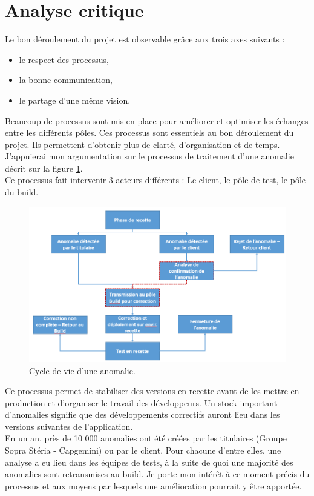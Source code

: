\documentclass[12pt,a4paper]{article}
\begin{document}
\section{Analyse critique}
Le bon déroulement du projet est observable grâce aux trois axes suivants :
\begin{itemize}
\item le respect des processus,
\item la bonne communication,
\item le partage d'une même vision.
\end{itemize}
Beaucoup de processus sont mis en place pour améliorer et optimiser les échanges entre les différents pôles. Ces processus sont essentiels au bon déroulement du projet. Ils permettent d'obtenir plus de clarté, d'organisation et de temps. J'appuierai mon argumentation sur le processus de traitement d'une anomalie décrit sur la figure \ref{cycleVieAnomalie}.\\
Ce processus fait intervenir 3 acteurs différents : Le client, le pôle de test, le pôle du build. 
\begin{figure}[!hp]
		\begin{center}
			\includegraphics[width=1.1\textwidth,keepaspectratio]{cycleAnomalie2.png}
			\caption{Cycle de vie d'une anomalie.}
			\label{cycleVieAnomalie}
		\end{center}
\end{figure}
\clearpage
\newpage
Ce processus permet de stabiliser des versions en recette avant de les mettre en production et d'organiser le travail des développeurs. Un stock important d'anomalies signifie que des développements correctifs auront lieu dans les versions suivantes de l'application.\\
En un an, près de 10 000 anomalies ont été créées par les titulaires (Groupe Sopra Stéria - Capgemini) ou par le client. Pour chacune d'entre elles, une analyse a eu lieu dans les équipes de tests, à la suite de quoi une majorité des anomalies sont retransmises au build. Je porte mon intérêt à ce moment précis du processus et aux moyens par lesquels une amélioration pourrait y être apportée.\\
\end{document}
